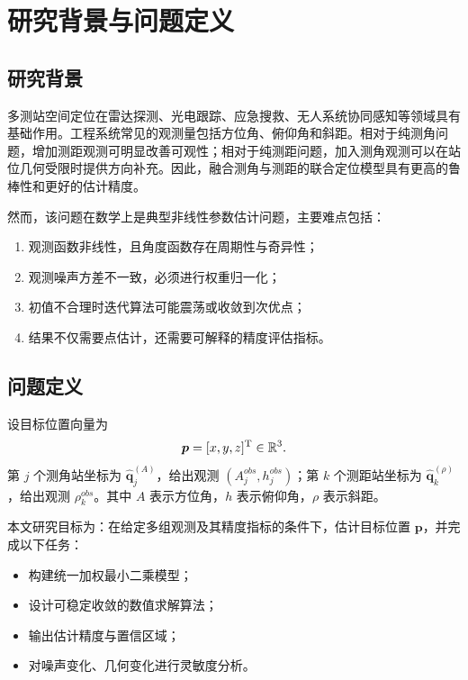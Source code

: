 \chapter{研究背景与问题定义}

\section{研究背景}
多测站空间定位在雷达探测、光电跟踪、应急搜救、无人系统协同感知等领域具有基础作用。工程系统常见的观测量包括方位角、俯仰角和斜距。相对于纯测角问题，增加测距观测可明显改善可观性；相对于纯测距问题，加入测角观测可以在站位几何受限时提供方向补充。因此，融合测角与测距的联合定位模型具有更高的鲁棒性和更好的估计精度。

然而，该问题在数学上是典型非线性参数估计问题，主要难点包括：
\begin{enumerate}
  \item 观测函数非线性，且角度函数存在周期性与奇异性；
  \item 观测噪声方差不一致，必须进行权重归一化；
  \item 初值不合理时迭代算法可能震荡或收敛到次优点；
  \item 结果不仅需要点估计，还需要可解释的精度评估指标。
\end{enumerate}

\section{问题定义}
设目标位置向量为
\[
\bm p=[x,y,z]^{\mathrm{T}}\in\mathbb{R}^3.
\]
第 $j$ 个测角站坐标为 $\hat{\bm q}^{(A)}_j$，给出观测 $(A_j^{obs},h_j^{obs})$；第 $k$ 个测距站坐标为 $\hat{\bm q}^{(\rho)}_k$，给出观测 $\rho_k^{obs}$。其中 $A$ 表示方位角，$h$ 表示俯仰角，$\rho$ 表示斜距。

本文研究目标为：在给定多组观测及其精度指标的条件下，估计目标位置 $\bm p$，并完成以下任务：
\begin{itemize}
  \item 构建统一加权最小二乘模型；
  \item 设计可稳定收敛的数值求解算法；
  \item 输出估计精度与置信区域；
  \item 对噪声变化、几何变化进行灵敏度分析。
\end{itemize}

